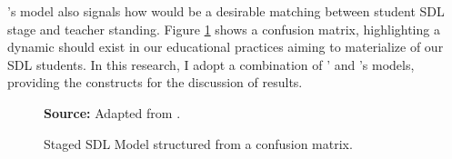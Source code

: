 's model also signals how would be a desirable matching between student \gls{SDL} stage and teacher standing. Figure \ref{fig:ssdl-matrix} shows a confusion matrix, highlighting a dynamic should exist in our educational practices aiming to materialize of our \gls{SDL} students. In this research, I adopt a combination of ’ and 's models, providing the constructs for the discussion of results.

\begin{figure}[ht!]
\centering

\caption{\textmd{Staged \acrshort{SDL} Model structured from a confusion matrix.}}
\label{fig:ssdl-matrix}

\par\medskip\ABNTEXfontereduzida\selectfont\textbf{Source:} Adapted from \cite{grow:1991}.%
\end{figure}